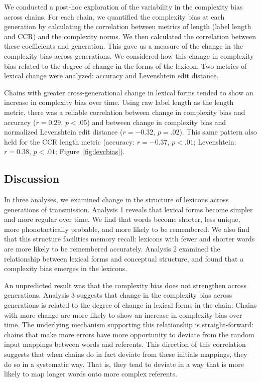 We  conducted a post-hoc exploration of the variability in the complexity bias across chains. For each chain, we quantified the complexity bias at each generation by calculating the correlation between metrics of length (label length and CCR) and the complexity norms. We then calculated the correlation between these coefficients and generation. This gave us a measure of the change in the complexity bias across generations. We considered how this change in complexity bias related to the degree of change in the forms of the lexicon. Two metrics of lexical change were analyzed: accuracy and Levenshtein edit distance. 

Chains with greater cross-generational change in lexical forms tended to show an increase in complexity bias over time. Using raw label length as the length metric, there was a reliable correlation between change in complexity bias and accuracy ($r=0.29$, $p <.05$) and between  change in complexity bias  and normalized Levenshtein edit distance ($r=-0.32$, $p =.02$). This same pattern also held for the CCR length metric (accuracy: $r=-0.37$, $p <.01$; Levenshtein: $r=0.38$, $p <.01$; Figure\ \ref{fig:levcbias}).




\subsection{Discussion}

In three analyses, we examined change in the structure of lexicons across generations of transmission. Analysis  1 reveals that lexical forms become simpler and more regular over time. We find that words become shorter, less unique, more phonotactically probable, and more likely to be remembered. We also find that this structure facilities memory recall: lexicons with fewer and shorter words are more likely to be remembered accurately. Analysis  2 examined the relationship between lexical forms and conceptual structure, and found that a complexity bias emerges in the lexicons. 

An unpredicted result was that the complexity bias does not strengthen across generations. Analysis  3 suggests that change in the complexity bias across generations is related to the degree of change in lexical forms in the chain: Chains with more change are more likely to show an increase in complexity bias over time. The underlying mechanism supporting this relationship is straight-forward: chains that make more errors have more opportunity to deviate from the random input mappings between words and referents. This direction of this correlation suggests that when chains do in fact deviate from these initials mappings, they do so in a systematic way. That is, they tend to deviate in a way that is more likely to map longer words onto more complex referents.

